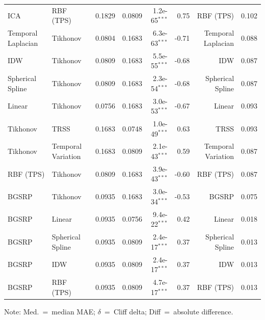 \begin{table}[ht]
{\begin{tabular}{llrrrrrr}
ICA & RBF (TPS) & 0.1829 & 0.0809 & 1.2e-65$^{***}$ & 0.75 & RBF (TPS) & 0.102 \\
Temporal Laplacian & Tikhonov & 0.0804 & 0.1683 & 6.3e-63$^{***}$ & -0.71 & Temporal Laplacian & 0.088 \\
IDW & Tikhonov & 0.0809 & 0.1683 & 5.5e-55$^{***}$ & -0.68 & IDW & 0.087 \\
Spherical Spline & Tikhonov & 0.0809 & 0.1683 & 2.3e-54$^{***}$ & -0.68 & Spherical Spline & 0.087 \\
Linear & Tikhonov & 0.0756 & 0.1683 & 3.0e-53$^{***}$ & -0.67 & Linear & 0.093 \\
Tikhonov & TRSS & 0.1683 & 0.0748 & 1.0e-49$^{***}$ & 0.63 & TRSS & 0.093 \\
Tikhonov & Temporal Variation & 0.1683 & 0.0809 & 2.1e-43$^{***}$ & 0.59 & Temporal Variation & 0.087 \\
RBF (TPS) & Tikhonov & 0.0809 & 0.1683 & 3.9e-43$^{***}$ & -0.60 & RBF (TPS) & 0.087 \\
BGSRP & Tikhonov & 0.0935 & 0.1683 & 3.0e-34$^{***}$ & -0.53 & BGSRP & 0.075 \\
BGSRP & Linear & 0.0935 & 0.0756 & 9.4e-22$^{***}$ & 0.42 & Linear & 0.018 \\
BGSRP & Spherical Spline & 0.0935 & 0.0809 & 2.4e-17$^{***}$ & 0.37 & Spherical Spline & 0.013 \\
BGSRP & IDW & 0.0935 & 0.0809 & 2.4e-17$^{***}$ & 0.37 & IDW & 0.013 \\
BGSRP & RBF (TPS) & 0.0935 & 0.0809 & 4.7e-17$^{***}$ & 0.37 & RBF (TPS) & 0.013 \\
\bottomrule
\end{tabular}
}
\footnotesize Note: Med.~=~median MAE; $\delta$~=~Cliff delta; Diff~=~absolute difference.
\end{table}